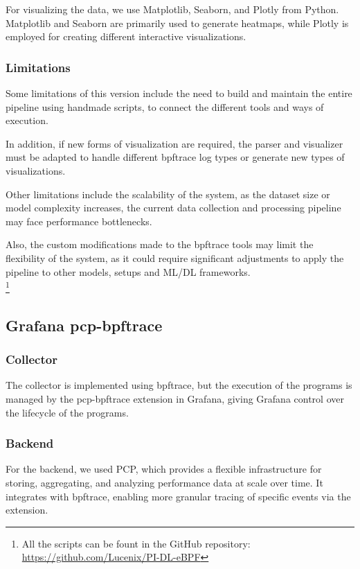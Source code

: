 \documentclass[conference]{IEEEtran}
\begin{document}
For visualizing the data, we use Matplotlib, Seaborn, and Plotly from Python.
Matplotlib and Seaborn are primarily used to generate heatmaps, while Plotly is employed for creating different interactive visualizations.

\subsubsection{Limitations}

Some limitations of this version include the need to build and maintain the entire pipeline using handmade scripts, to connect the different tools and ways of execution.

In addition, if new forms of visualization are required, the parser and visualizer must be adapted to handle different bpftrace log types or generate new types of visualizations.

Other limitations include the scalability of the system, as the dataset size or model complexity increases, the current data collection and processing pipeline may face performance bottlenecks.

Also, the custom modifications made to the bpftrace tools may limit the flexibility of the system, as it could require significant adjustments to apply the pipeline to other models, setups and ML/DL frameworks.\\

\footnote{All the scripts can be fount in the GitHub repository: \url{https://github.com/Lucenix/PI-DL-eBPF}}

\subsection{Grafana pcp-bpftrace}

\subsubsection{Collector}

The collector is implemented using bpftrace, but the execution of the programs is managed by the pcp-bpftrace extension in Grafana, giving Grafana control over the lifecycle of the programs.

\subsubsection{Backend}

For the backend, we used PCP, which provides a flexible infrastructure for storing, aggregating, and analyzing performance data at scale over time.
It integrates with bpftrace, enabling more granular tracing of specific events via the extension.
\end{document}
